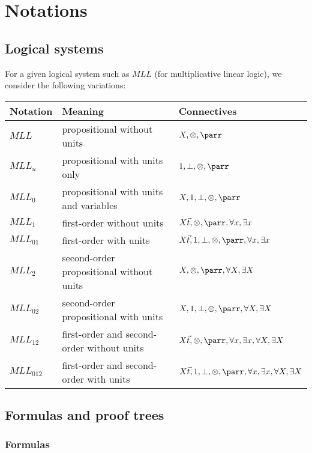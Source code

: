 \chapter{Notations}\label{notations}

\section{Logical systems}\label{logical-systems}

For a given logical system such as $MLL$ (for
multiplicative linear logic), we consider the following variations:
\begin{center}
\begin{tabular}{lll}
\hline
Notation & Meaning & Connectives\\
\hline
$MLL$ &
propositional without units &
$X,{\tens},{\parr}$\\
$MLL_u$ &
propositional with units only &
$\one,\bot,{\tens},{\parr}$\\
$MLL_0$ &
propositional with units and variables &
$X,\one,\bot,{\tens},{\parr}$\\
$MLL_1$ &
first-order without units &
$X\vec{t},{\tens},{\parr},\forall x,\exists x$\\
$MLL_{01}$ &
first-order with units &
$X\vec{t},\one,\bot,{\tens},{\parr},\forall x,\exists x$\\
$MLL_2$ &
second-order propositional without units &
$X,{\tens},{\parr},\forall X,\exists X$\\
$MLL_{02}$ &
second-order propositional with units &
$X,\one,\bot,{\tens},{\parr},\forall X,\exists X$\\
$MLL_{12}$ &
first-order and second-order without units &
$X\vec{t},{\tens},{\parr},\forall x,\exists x,\forall X,\exists X$\\
$MLL_{012}$
& first-order and second-order with units &
$X\vec{t},\one,\bot,{\tens},{\parr},\forall x,\exists x,\forall X,\exists X$\\
\hline
\end{tabular}
\end{center}

\section{Formulas and proof trees}\label{formulas-and-proof-trees}

\subsection{Formulas}

